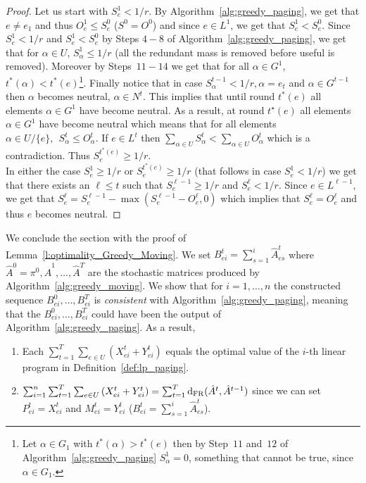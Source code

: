 \begin{proof}
\noindent Let us start with $S_e^1 < 1/r$. By Algorithm~\ref{alg:greedy_paging}, we get that $e \neq e_1$ and thus $O_e^1 \leq S_e^0$ ($S^0 =O^0$) and since $e \in L^1$, we get that $S_e^1 < S_e^0$. Since $S_e^1 < 1/r$ and $S_e^1 < S_e^0$ by Steps $4-8$ of Algorithm~\ref{alg:greedy_paging}, we get that for $\alpha \in U$, $S_\alpha^1 \leq 1/r$ (all the redundant mass is removed before useful is removed). Moreover by Steps~$11-14$ we get that for all $\alpha \in G^1$, $t^\ast(\alpha) < t^\ast(e)$\footnote{Let $\alpha \in G_1$ with $t^\ast(\alpha) > t^\ast(e)$
then by Step~$11$ and~$12$ of Algorithm~\ref{alg:greedy_paging} $S_\alpha^1 =0$, something that cannot be true, since $\alpha \in G_1$.
}. Finally notice that in case $S_\alpha^{t-1}<1/r, \alpha = e_t$ and $\alpha \in G^{t-1}$ then $\alpha$ becomes neutral, $\alpha \in N^t$. This implies that until round $t^\ast(e)$ all elements $\alpha \in G^1$ have become neutral. As a result, at round $t^\star(e)$ all elements $\alpha \in G^1$ have become neutral which means that for all elements $\alpha \in U / \{e\},~~ S^t_\alpha \leq O^t_\alpha$. If $e \in L^t$ then $\sum_{\alpha \in U} S_\alpha ^t < \sum_{\alpha \in U} O_\alpha^t$ which is a contradiction. Thus $ S_{e}^{t^\ast(e)} \geq 1/r$.\\

\noindent In either the case $S_e^1 
\geq 1/r$ or $ S_{e}^{t^\ast(e)} \geq 1/r$ (that follows in case $S_e^1 
< 1/r$) we get that there exists an $\ell \leq t$ such that $S_e^{\ell-1} \geq 1/r $ and 
$S_e^{\ell} < 1/r $. Since $e \in L^{\ell - 1}$, we get that $S_e^\ell = S_e^{\ell-1} - \max(S_e^{\ell-1}-O_e^\ell,0)$ which implies that $S_e^\ell = O_e^\ell$ and thus $e$ becomes neutral.
\end{proof}

\noindent We conclude the section with the proof of Lemma~\ref{l:optimality_Greedy_Moving}. We set $B_{ei}^t = \sum_{s=1}^i \hat{A}_{es}^t$ where $\hat{A}^0 = \pi^0, \hat{A}^1,\ldots,\hat{A}^T$ are the stochastic matrices produced by Algorithm~\ref{alg:greedy_moving}. We show that for $i=1,\ldots,n$ the constructed sequence $B_{ei}^0, \ldots,B_{ei}^T$ is \textit{consistent} with Algorithm~\ref{alg:greedy_paging}, meaning that the $B_{ei}^0, \ldots,B_{ei}^T$ could have been the output of Algorithm~\ref{alg:greedy_paging}. As a result,

\begin{enumerate}
    \item Each $\sum_{t=1}^T \sum_{e \in U} \left(X_{ei}^t + Y_{ei}^t \right)$ equals the optimal value of the $i$-th linear program in Definition~\ref{def:lp_paging}.
    
    \item $ \sum_{i=1}^n \sum_{t=1}^T \sum_{e \in U} \left(X_{ei}^t + Y_{ei}^t \right) = \sum_{t=1}^T \mathrm{d}_{\mathrm{FR}}(\hat{A}^t,\hat{A}^{t-1})$ since we can set $P_{ei}^t = X_{ei}^t$ and $M_{ei}^t = Y_{ei}^t$ ($B_{ei}^t = \sum_{s=1}^i \hat{A}_{es}^t$).
\end{enumerate}


